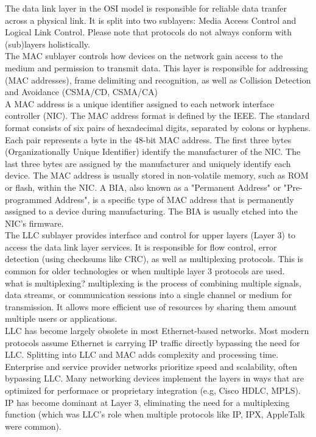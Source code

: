 \documentclass{article}
\begin{document}
The data link layer in the OSI model is responsible for reliable data tranfer across a physical link. It is split into two sublayers: Media Access Control and Logical Link Control. Please note that protocols do not always conform with (sub)layers holistically.\\ 

The MAC sublayer controls how devices on the network gain access to the medium and permission to transmit data. This layer is responsible for addressing (MAC addresses), frame delimiting and recognition, as well as Collision Detection and Avoidance (CSMA/CD, CSMA/CA)\\

A MAC address is a unique identifier assigned to each network interface controller (NIC). The MAC address format is defined by the IEEE. The standard format consists of six pairs of hexadecimal digits, separated by colons or hyphens. Each pair represents a byte in the 48-bit MAC address. The first three bytes (Organizationally Unique Identifier) identify the manufacturer of the NIC. The last three bytes are assigned by the manufacturer and uniquely identify each device. The MAC address is usually stored in non-volatile memory, such as ROM or flash, within the NIC. A BIA, also known as a "Permanent Address" or "Pre-programmed Address", is a specific type of MAC address that is permanently assigned to a device during manufacturing. The BIA is usually etched into the NIC's firmware.\\

The LLC sublayer provides interface and control for upper layers (Layer 3) to access the data link layer services. It is responsible for flow control, error detection (using checksums like CRC), as well as multiplexing protocols. This is common for older technologies or when multiple layer 3 protocols are used.\\
what is multiplexing? multiplexing is the process of combining multiple signals, data streams, or communication sessions into a single channel or medium for transmission. It allows more efficient use of resources by sharing them amount multiple users or applications.\\

LLC has become largely obsolete in most Ethernet-based networks. Most modern protocols assume Ethernet is carrying IP traffic directly bypassing the need for LLC. Splitting into LLC and MAC adds complexity and processing time. Enterprise and service provider networks prioritize speed and scalability, often bypassing LLC. Many networking devices implement the layers in ways that are optimized for performace or proprietary integration (e.g, Cisco HDLC, MPLS). IP has become dominant at Layer 3, eliminating the need for a multiplexing function (which was LLC's role when multiple protocols like IP, IPX, AppleTalk were common).\\
\end{document}
